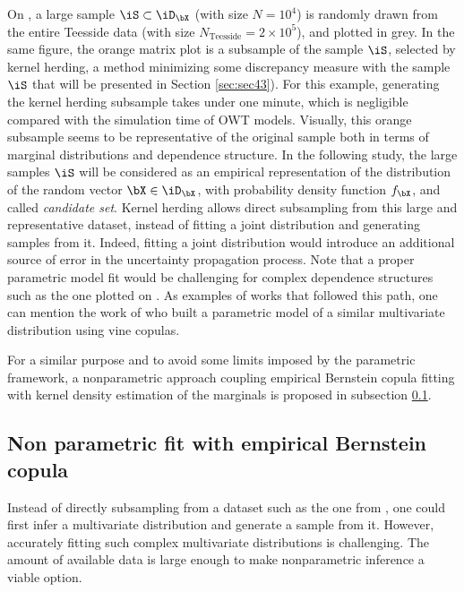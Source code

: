 On , a large sample $\iS \subset \iD_{\bX}$ (with size $N=10^4$) is randomly drawn from the entire Teesside data (with size $N_{\mathrm{Teesside}} = 2\times 10^5$), and plotted in grey. 
In the same figure, the orange matrix plot is a subsample of the sample $\iS$, selected by kernel herding, a method minimizing some discrepancy measure with the sample $\iS$ that will be presented in Section \ref{sec:sec43}). 
For this example, generating the kernel herding subsample takes under one minute, which is negligible compared with the simulation time of OWT models. 
Visually, this orange subsample seems to be representative of the original sample both in terms of marginal distributions and dependence structure. 
In the following study, the large samples $\iS$ will be considered as an empirical representation of the distribution of the random vector $\bX \in \iD_{\bX}$, with probability density function $f_{\bX}$, and called \textit{candidate set}. 
Kernel herding allows direct subsampling from this large and representative dataset, instead of fitting a joint distribution and generating samples from it.
Indeed, fitting a joint distribution would introduce an additional source of error in the uncertainty propagation process.
Note that a proper parametric model fit would be challenging for complex dependence structures such as the one plotted on . 
As examples of works that followed this path, one can mention the work of \citet{li_zhan_2020} who built a parametric model of a similar multivariate distribution using vine copulas. 

For a similar purpose and to avoid some limits imposed by the parametric framework, a nonparametric approach coupling empirical Bernstein copula fitting with kernel density estimation of the marginals is proposed in subsection \ref{sec:4ebc}.


\subsection{Non parametric fit with empirical Bernstein copula}\label{sec:4ebc}
Instead of directly subsampling from a dataset such as the one from , one could first infer a multivariate distribution and generate a sample from it. 
However, accurately fitting such complex multivariate distributions is challenging. 
The amount of available data is large enough to make nonparametric inference a viable option.

